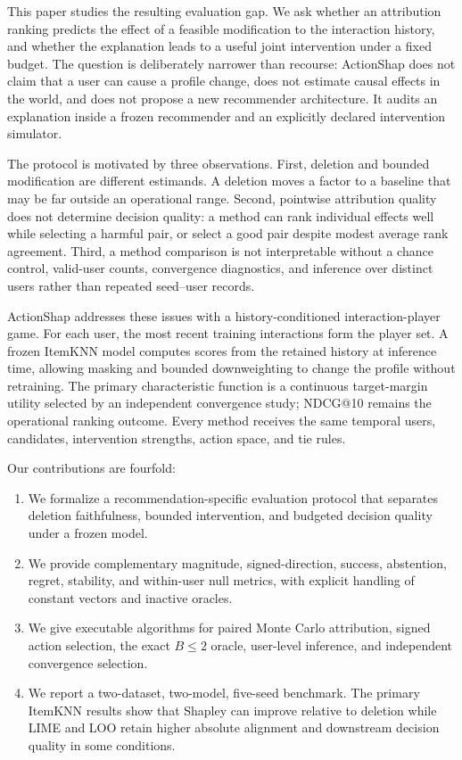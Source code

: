 \documentclass[pdflatex,sn-basic,Numbered]{sn-jnl}
\theoremstyle{thmstyleone}
\theoremstyle{thmstyletwo}
\theoremstyle{thmstylethree}
\begin{document}
This paper studies the resulting evaluation gap. We ask whether an attribution ranking predicts the effect of a feasible modification to the interaction history, and whether the explanation leads to a useful joint intervention under a fixed budget. The question is deliberately narrower than recourse: ActionShap does not claim that a user can cause a profile change, does not estimate causal effects in the world, and does not propose a new recommender architecture. It audits an explanation inside a frozen recommender and an explicitly declared intervention simulator.

The protocol is motivated by three observations. First, deletion and bounded modification are different estimands. A deletion moves a factor to a baseline that may be far outside an operational range. Second, pointwise attribution quality does not determine decision quality: a method can rank individual effects well while selecting a harmful pair, or select a good pair despite modest average rank agreement. Third, a method comparison is not interpretable without a chance control, valid-user counts, convergence diagnostics, and inference over distinct users rather than repeated seed--user records.

ActionShap addresses these issues with a history-conditioned interaction-player game. For each user, the most recent training interactions form the player set. A frozen ItemKNN model computes scores from the retained history at inference time, allowing masking and bounded downweighting to change the profile without retraining. The primary characteristic function is a continuous target-margin utility selected by an independent convergence study; NDCG@10 remains the operational ranking outcome. Every method receives the same temporal users, candidates, intervention strengths, action space, and tie rules.

Our contributions are fourfold:
\begin{enumerate}
  \item We formalize a recommendation-specific evaluation protocol that separates deletion faithfulness, bounded intervention, and budgeted decision quality under a frozen model.
  \item We provide complementary magnitude, signed-direction, success, abstention, regret, stability, and within-user null metrics, with explicit handling of constant vectors and inactive oracles.
  \item We give executable algorithms for paired Monte Carlo attribution, signed action selection, the exact $B\le2$ oracle, user-level inference, and independent convergence selection.
  \item We report a two-dataset, two-model, five-seed benchmark. The primary ItemKNN results show that Shapley can improve relative to deletion while LIME and LOO retain higher absolute alignment and downstream decision quality in some conditions.
\end{enumerate}
\end{document}
